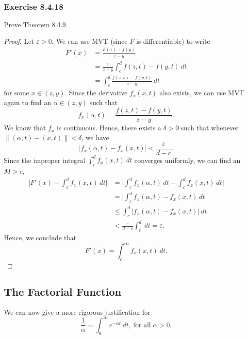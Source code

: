\subsubsection{Exercise 8.4.18} Prove Theorem 8.4.9.
\begin{proof}
Let \( \varepsilon > 0  \). We can use MVT (since \( F  \) is differentiable) to write  
\begin{align*}
    F'(x) &= \frac{ F(z) - f(y)  }{ z - y  }  \\
          &= \frac{ 1 }{ z - y  } \int_{ c }^{ d } f(z,t) - f(y,t) \  dt \\
          &= \int_{ c }^{ d }  \frac{ f(z,t) - f(y,t)  }{ z - y } \ dt
\end{align*}
for some \( x \in (z,y)   \). Since the derivative \( f_{x}(x,t)  \) also exists, we can use MVT again to find an \( \alpha \in (z,y)   \) such that 
\[  f_{x}(\alpha, t) = \frac{ f(z,t) - f(y,t)  }{ z - y  }. \] 
We know that \( f_{x} \) is continuous. Hence, there exists a \(  \delta  > 0 \) such that whenever \( \lVert (\alpha, t) - (x,t)  \rVert < \delta \), we have 
\[  | f_{x}(\alpha, t ) - f_{x}(x, t) | < \frac{ \varepsilon  }{ d - c  }.\]
Since the improper integral \( \int_{ c }^{ d }   f_{x}(x,t) \ dt  \) converges uniformly, we can find an \( M > c  \),
\begin{align*}
    \Big| F'(x) - \int_{ c }^{ d } f_{x}(x,t) \ dt \Big| &= \Big| \int_{ c }^{ d }  f_{x}(\alpha, t) \ dt - \int_{ c }^{ d }  f_{x}(x,t) \ dt \Big|  \\
                                                         &= \Big| \int_{ c }^{ d }  f_{x}(\alpha, t) - f_{x}(x,t) \ dt \Big|  \\
                                                         &\leq \int_{ c }^{ d }  | f_{x}(\alpha, t ) - f_{x}(x,t)  | \ dt \\
                                                         &< \frac{ \varepsilon  }{  d-c   }  \int_{ c }^{ d }  \ dt = \varepsilon.
\end{align*}
Hence, we conclude that 
\[  F'(x) = \int_{ c }^{ \infty } f_{x}(x,t) \  dt. \]
\end{proof}


\subsection{The Factorial Function}

We can now give a more rigorous justification for 
\[  \frac{ 1  }{  \alpha  } = \int_{ 0 }^{  \infty  }  e^{- \alpha t } \ dt, \ \text{for all } \alpha > 0.  \tag{8} \]

